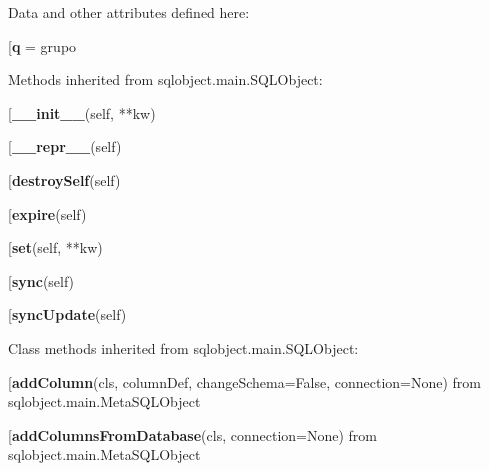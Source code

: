 Data and other attributes defined here:\\
\begin{description}\item[{\bf q} = grupo\end{description}


Methods inherited from sqlobject.main.SQLObject:\\
\begin{description}\item[{\bf \_\_init\_\_}(self, **kw)\end{description}

\begin{description}\item[{\bf \_\_repr\_\_}(self)\end{description}

\begin{description}\item[{\bf destroySelf}(self)\end{description}

\begin{description}\item[{\bf expire}(self)\end{description}

\begin{description}\item[{\bf set}(self, **kw)\end{description}

\begin{description}\item[{\bf sync}(self)\end{description}

\begin{description}\item[{\bf syncUpdate}(self)\end{description}


Class methods inherited from sqlobject.main.SQLObject:\\
\begin{description}\item[{\bf addColumn}(cls, columnDef, changeSchema=False, connection=None) from sqlobject.main.MetaSQLObject\end{description}

\begin{description}\item[{\bf addColumnsFromDatabase}(cls, connection=None) from sqlobject.main.MetaSQLObject\end{description}


